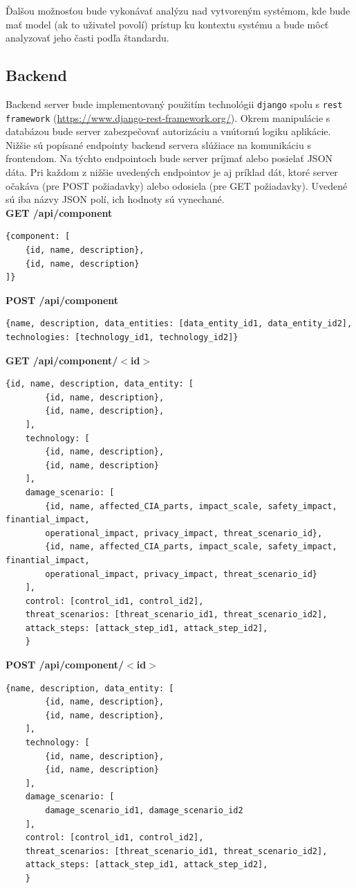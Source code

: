 \documentclass[11pt]{article}
\begin{document}
Ďalšou možnosťou bude vykonávať analýzu nad vytvoreným systémom, kde bude mať model (ak to uživatel povolí) prístup ku kontextu systému a bude môcť analyzovať jeho časti podľa štandardu.

\subsection{Backend}
Backend server bude implementovaný použitím technológii \texttt{django} spolu s \texttt{rest framework} (\url{https://www.django-rest-framework.org/}). Okrem manipulácie s databázou bude server zabezpečovať autorizáciu a vnútornú logiku aplikácie. Nižšie sú popísané endpointy backend servera slúžiace na komunikáciu s frontendom. Na týchto endpointoch bude server príjmať alebo posielať JSON dáta.  Pri každom z nižšie uvedených endpointov je aj príklad dát, ktoré server očakáva (pre POST požiadavky) alebo odosiela (pre GET požiadavky). Uvedené sú iba názvy JSON polí, ich hodnoty sú vynechané. \\

\textbf{GET /api/component}
\begin{verbatim}
{component: [
    {id, name, description},
    {id, name, description}
]}
\end{verbatim}

\vspace{1cm}
\textbf{POST /api/component}
\begin{verbatim}
{name, description, data_entities: [data_entity_id1, data_entity_id2], 
technologies: [technology_id1, technology_id2]}
\end{verbatim}

\vspace{1cm}
\textbf{GET /api/component/$<$id$>$}
\begin{verbatim}
{id, name, description, data_entity: [
        {id, name, description},
        {id, name, description},
    ], 
	technology: [
		{id, name, description},
		{id, name, description}
	],
	damage_scenario: [
		{id, name, affected_CIA_parts, impact_scale, safety_impact, finantial_impact, 
        operational_impact, privacy_impact, threat_scenario_id},
		{id, name, affected_CIA_parts, impact_scale, safety_impact, finantial_impact, 
        operational_impact, privacy_impact, threat_scenario_id}
	],
	control: [control_id1, control_id2],
	threat_scenarios: [threat_scenario_id1, threat_scenario_id2],
	attack_steps: [attack_step_id1, attack_step_id2],
	}
\end{verbatim}
\vspace{1cm}
\textbf{POST /api/component/$<$id$>$} 
\begin{verbatim}
{name, description, data_entity: [
        {id, name, description},
        {id, name, description},
    ], 
	technology: [
		{id, name, description},
		{id, name, description}
	],
	damage_scenario: [
		damage_scenario_id1, damage_scenario_id2
	],
	control: [control_id1, control_id2],
	threat_scenarios: [threat_scenario_id1, threat_scenario_id2],
	attack_steps: [attack_step_id1, attack_step_id2],
	}
\end{verbatim}
\end{document}
